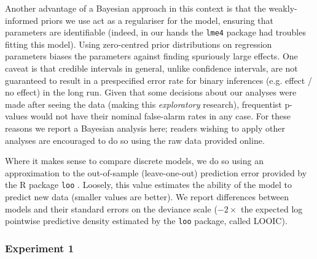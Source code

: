 \documentclass[doc, 11pt,a4paper,natbib]{apa6}\usepackage[]{graphicx}\usepackage[]{color}
\begin{document}
Another advantage of a Bayesian approach in this context is that the weakly-informed priors we use act as a regulariser for the model, ensuring that parameters are identifiable (indeed, in our hands the \texttt{lme4} package had troubles fitting this model). 
Using zero-centred prior distributions on regression parameters biases the parameters against finding spuriously large effects.
One caveat is that credible intervals in general, unlike confidence intervals, are not guaranteed to result in a prespecified error rate for binary inferences (e.g. effect / no effect) in the long run.
Given that some decisions about our analyses were made after seeing the data (making this \textit{exploratory} research), frequentist p-values would not have their nominal false-alarm rates in any case.
For these reasons we report a Bayesian analysis here; readers wishing to apply other analyses are encouraged to do so using the raw data provided online.

Where it makes sense to compare discrete models, we do so using an approximation to the out-of-sample (leave-one-out) prediction error provided by the R package \texttt{loo} \citep[v 0.1.6;][]{vehtari_practical_2016}.
Loosely, this value estimates the ability of the model to predict new data (smaller values are better).
We report differences between models and their standard errors on the deviance scale ($-2 \times$ the expected log pointwise predictive density estimated by the \texttt{loo} package, called LOOIC).

\subsubsection{Experiment 1}
\end{document}
